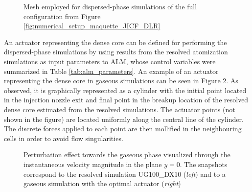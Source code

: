 \begin{figure}[h!]
	\centering
	\caption{Mesh employed for dispersed-phase simulations of the full configuration from Figure \ref{fig:numerical_setup_maquette_JICF_DLR}}
	\label{fig:jicf_dlr_mesh_LGS}
\end{figure}


An actuator representing the dense core can be defined for performing the dispersed-phase simulations by using results from the resolved atomization simulations as input parameters to ALM, whose control variables were summarized in Table \ref{tab:alm_parameters}. An example of an actuator representing the dense core in gaseous simulations can be seen in Figure \ref{fig:u_inst_SPS_and_ALM}. As observed, it is graphically represented as a cylinder with the initial point located in the injection nozzle exit and final point in the breakup location of the resolved dense core estimated from the resolved simulations. The actuator points (not shown in the figure) are located uniformly along the central line of the cylinder. The discrete forces applied to each point are then mollified in the neighbouring cells in order to avoid flow singularities.


\begin{figure}[h!]
	\centering	{}
	\caption[Perturbation effect towards the gaseous phase visualized through the instantaneous velocity magnitude in the plane $y = 0$]{Perturbation effect towards the gaseous phase visualized through the instantaneous velocity magnitude in the plane $y = 0$. The snapshots correspond to the resolved simulation UG100\_DX10 (\textsl{left}) and to a gaseous simulation with the optimal actuator (\textsl{right})}	
	\label{fig:u_inst_SPS_and_ALM}
\end{figure}


